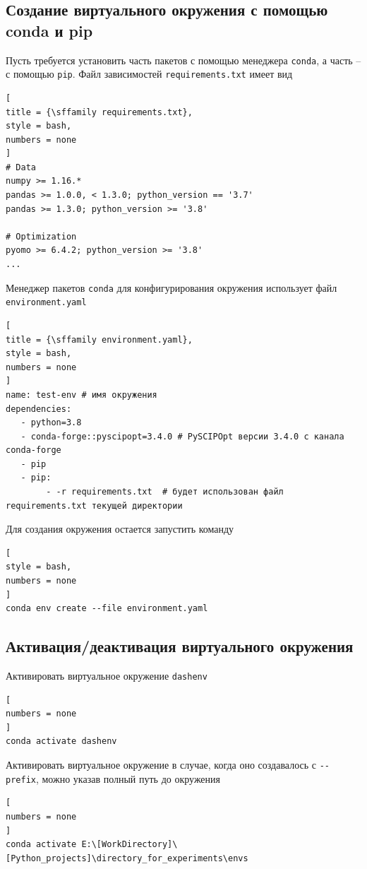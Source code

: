 \documentclass[%
	11pt,
	a4paper,
	utf8,
		]{article}
\begin{document}
\subsection{Создание виртуального окружения с помощью conda и pip}

Пусть требуется установить часть пакетов с помощью менеджера \texttt{conda}, а часть -- с помощью \texttt{pip}. Файл зависимостей \texttt{requirements.txt} имеет вид
\begin{lstlisting}[
title = {\sffamily requirements.txt},
style = bash,
numbers = none
]
# Data
numpy >= 1.16.*
pandas >= 1.0.0, < 1.3.0; python_version == '3.7'
pandas >= 1.3.0; python_version >= '3.8'

# Optimization
pyomo >= 6.4.2; python_version >= '3.8'
...
\end{lstlisting}

Менеджер пакетов \texttt{conda} для конфигурирования окружения использует файл \texttt{environment.yaml}
\begin{lstlisting}[
title = {\sffamily environment.yaml},
style = bash,
numbers = none
]
name: test-env # имя окружения
dependencies:
   - python=3.8
   - conda-forge::pyscipopt=3.4.0 # PySCIPOpt версии 3.4.0 с канала conda-forge
   - pip
   - pip:
        - -r requirements.txt  # будет использован файл requirements.txt текущей директории
\end{lstlisting}

Для создания окружения остается запустить команду
\begin{lstlisting}[
style = bash,
numbers = none
]
conda env create --file environment.yaml
\end{lstlisting}


\subsection{Активация/деактивация виртуального окружения}

Активировать виртуальное окружение \texttt{dashenv}

\begin{lstlisting}[
numbers = none
]
conda activate dashenv
\end{lstlisting}

Активировать виртуальное окружение в случае, когда оно создавалось с \lstinline{--prefix}, можно указав полный путь до окружения
\begin{lstlisting}[
numbers = none
]
conda activate E:\[WorkDirectory]\[Python_projects]\directory_for_experiments\envs
\end{lstlisting}
\end{document}
